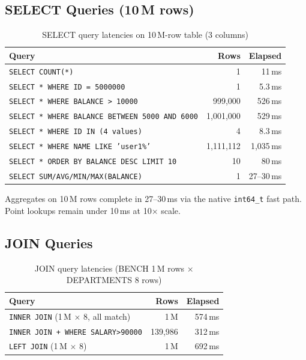 \documentclass[12pt,a4paper]{article}
\begin{document}
\subsection{SELECT Queries (10\,M rows)}

\begin{table}[H]
\centering
\begin{tabular}{L{9cm} r r}
\toprule
\textbf{Query} & \textbf{Rows} & \textbf{Elapsed} \\
\midrule
\texttt{SELECT COUNT(*)}                                     & 1         & 11\,ms     \\
\texttt{SELECT * WHERE ID = 5000000}                         & 1         & 5.3\,ms    \\
\texttt{SELECT * WHERE BALANCE > 10000}                      & 999,000   & 526\,ms    \\
\texttt{SELECT * WHERE BALANCE BETWEEN 5000 AND 6000}        & 1,001,000 & 529\,ms    \\
\texttt{SELECT * WHERE ID IN (4 values)}                     & 4         & 8.3\,ms    \\
\texttt{SELECT * WHERE NAME LIKE 'user1\%'}                  & 1,111,112 & 1,035\,ms  \\
\texttt{SELECT * ORDER BY BALANCE DESC LIMIT 10}             & 10        & 80\,ms     \\
\texttt{SELECT SUM/AVG/MIN/MAX(BALANCE)}                     & 1         & 27--30\,ms \\
\bottomrule
\end{tabular}
\caption{SELECT query latencies on 10\,M-row table (3 columns)}
\end{table}

Aggregates on 10\,M rows complete in 27--30\,ms via the native \texttt{int64\_t}
fast path.  Point lookups remain under 10\,ms at 10$\times$ scale.

\subsection{JOIN Queries}

\begin{table}[H]
\centering
\begin{tabular}{L{8cm} r r}
\toprule
\textbf{Query} & \textbf{Rows} & \textbf{Elapsed} \\
\midrule
\texttt{INNER JOIN} (1\,M $\times$ 8, all match)      & 1\,M    & 574\,ms \\
\texttt{INNER JOIN + WHERE SALARY>90000}               & 139,986 & 312\,ms \\
\texttt{LEFT JOIN} (1\,M $\times$ 8)                   & 1\,M    & 692\,ms \\
\bottomrule
\end{tabular}
\caption{JOIN query latencies (BENCH 1\,M rows $\times$ DEPARTMENTS 8 rows)}
\end{table}
\end{document}
